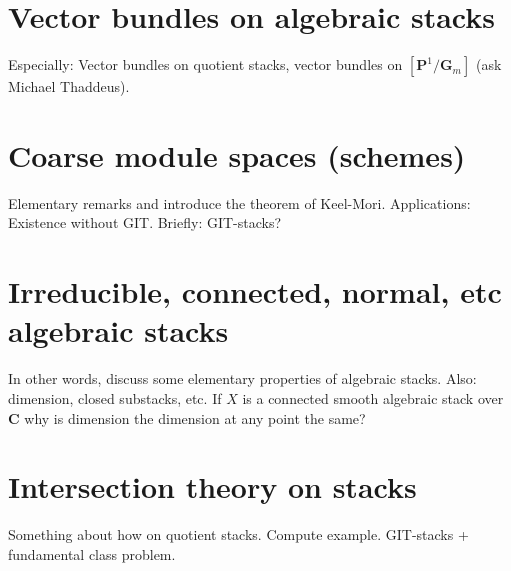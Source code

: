 \section{Vector bundles on algebraic stacks}
\label{section-vectorbundles}

\noindent
Especially: Vector bundles on quotient stacks,
vector bundles on $[\mathbf{P}^1/\mathbf{G}_m]$ (ask Michael Thaddeus).


\section{Coarse module spaces (schemes)}
\label{section-coarse}

\noindent
Elementary remarks and introduce the theorem of Keel-Mori.
Applications: Existence without GIT.
Briefly: GIT-stacks?


\section{Irreducible, connected, normal, etc algebraic stacks}
\label{section-elementary-properties}

\noindent
In other words, discuss some elementary properties of algebraic stacks.
Also: dimension, closed substacks, etc.
If $X$ is a connected smooth algebraic stack over $\mathbf{C}$
why is dimension the dimension at any point the same?

\section{Intersection theory on stacks}
\label{section-intersection-theory}

\noindent
Something about how on quotient stacks.
Compute example.
GIT-stacks + fundamental class problem.









